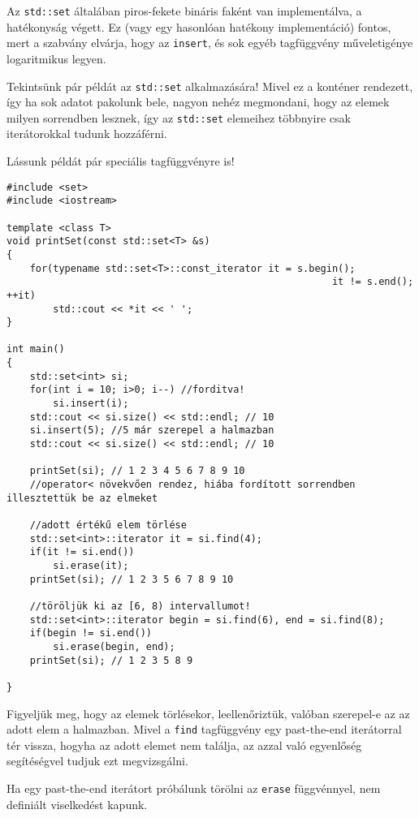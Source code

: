 \documentclass[../cpp_book/cpp_book.tex]{subfiles}
\begin{document}
	\begin{note}
		Az \texttt{std::set} általában piros-fekete bináris faként van implementálva, a hatékonyság végett. Ez (vagy egy hasonlóan hatékony implementáció) fontos, mert a szabvány elvárja, hogy az \texttt{insert}, és sok egyéb tagfüggvény műveletigénye logaritmikus legyen.
	\end{note}
	Tekintsünk pár példát az \texttt{std::set} alkalmazására! Mivel ez a konténer rendezett, így ha sok adatot pakolunk bele, nagyon nehéz megmondani, hogy az elemek milyen sorrendben lesznek, így az \texttt{std::set} elemeihez többnyire csak iterátorokkal tudunk hozzáférni.
	
	Lássunk példát pár speciális tagfüggvényre is!
\begin{lstlisting}
#include <set>
#include <iostream>

template <class T>
void printSet(const std::set<T> &s)
{
	for(typename std::set<T>::const_iterator it = s.begin(); 
													    it != s.end(); ++it)
		std::cout << *it << ' ';
}

int main()
{
	std::set<int> si; 
	for(int i = 10; i>0; i--) //forditva!
		si.insert(i);
	std::cout << si.size() << std::endl; // 10
	si.insert(5); //5 már szerepel a halmazban
	std::cout << si.size() << std::endl; // 10
	
	printSet(si); // 1 2 3 4 5 6 7 8 9 10
	//operator< növekvően rendez, hiába fordított sorrendben illesztettük be az elmeket
	
	//adott értékű elem törlése
	std::set<int>::iterator it = si.find(4);
	if(it != si.end())
		si.erase(it);
	printSet(si); // 1 2 3 5 6 7 8 9 10
	
	//töröljük ki az [6, 8) intervallumot!
	std::set<int>::iterator begin = si.find(6), end = si.find(8);
	if(begin != si.end())
		si.erase(begin, end);
	printSet(si); // 1 2 3 5 8 9
	
}
\end{lstlisting}
	Figyeljük meg, hogy az elemek törlésekor, leellenőriztük, valóban szerepel-e az az adott elem a halmazban. Mivel a \texttt{find} tagfüggvény egy past-the-end iterátorral tér vissza, hogyha az adott elemet nem találja, az azzal való egyenlőség segítéségvel tudjuk ezt megvizsgálni.
	
	Ha egy past-the-end iterátort próbálunk törölni az \texttt{erase} függvénnyel, nem definiált viselkedést kapunk.
	
\end{document}
